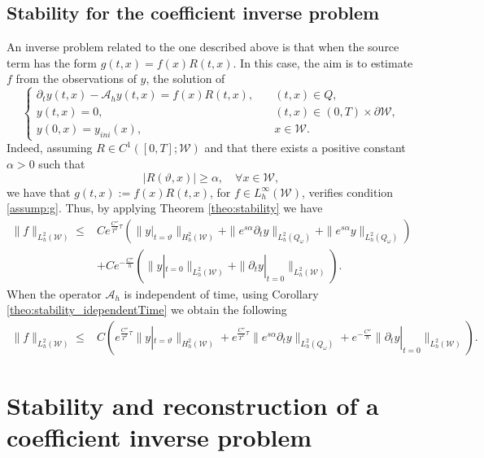 \documentclass{amsart}
\numberwithin{equation}{section}
\begin{document}
\subsection{Stability for the coefficient inverse problem}
An inverse problem related to the one described above is that when the source term has the form $g(t,x)=f(x)R(t,x)$. In this case, the aim is to estimate $f$ from the observations of $y$, the solution of
\begin{equation}\label{system:coefficient}
\begin{cases}
    \partial_{t}y(t,x)-\mathcal{A}_{h}y(t,x)=f(x)R(t,x),\quad &(t,x)\in Q,\\
    y(t,x)=0,& (t,x)\in (0,T)\times \partial\mathcal{W},\\
    y(0,x)=y_{ini}(x), &x\in\mathcal{W}.
\end{cases}
\end{equation}
 Indeed, assuming $R\in C^1([0,T];\mathcal{W})$ and that there exists a positive constant $\alpha>0$ such that  $$|R(\vartheta,x)|\geq\alpha,\quad\forall x\in\mathcal{W},$$
we have that $g(t,x):= f(x)R(t,x)$, for $f\in L^\infty_{h}({\mathcal{W}})$, verifies condition \eqref{assump:g}. Thus, by applying Theorem \ref{theo:stability} we have
\begin{equation}%
        \begin{aligned}
		    \|f\|_{L_h^2(\mathcal{W})}\leq &Ce^{\frac{C''}{T^2}\tau}\left(\|y|_{t=\vartheta}\|_{H_h^2(\mathcal{W})}+\|e^{s\alpha}\partial_{t}y\|_{L_h^2(Q_\omega)}+\|e^{s\alpha}y\|_{L_h^2(Q_\omega)}\right)\\
            &+Ce^{-\frac{C''}{h}}\left(\|y|_{t=0}\|_{L^2_h(\mathcal{W})}+\|\partial_{t}y|_{t=0}\|_{L^2_h(\mathcal{W})}\right).
            \end{aligned}
		\end{equation} 
When the operator $\mathcal{A}_h$ is independent of time, using Corollary \ref{theo:stability_idependentTime} we obtain the following
        \begin{equation}\label{stability:02}
        \begin{aligned}
		    \|f\|_{L_h^2(\mathcal{W})}\leq &C\left(e^{\frac{C''}{T^2}\tau}\|y|_{t=\vartheta}\|_{H_h^2(\mathcal{W})}+e^{\frac{C''}{T^2}\tau}\|e^{s\alpha}\partial_{t}y\|_{L_h^2(Q_\omega)}+e^{-\frac{C''}{h}}\|\partial_{t}y|_{t=0}\|_{L^2_h(\mathcal{W})}\right).
            \end{aligned}
		\end{equation} 

\section{Stability and reconstruction of a coefficient inverse problem}\label{sec:stability:reconstruction}
\end{document}
